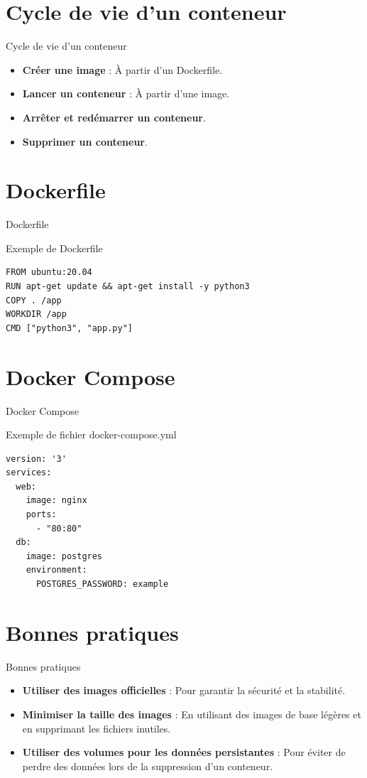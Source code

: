 \documentclass{clbeamer2024}
\begin{document}
\section{Cycle de vie d'un conteneur}
\begin{frame}{Cycle de vie d'un conteneur}
	\begin{itemize}
		\item \textbf{Créer une image} : À partir d'un Dockerfile.
		\item \textbf{Lancer un conteneur} : À partir d'une image.
		\item \textbf{Arrêter et redémarrer un conteneur}.
		\item \textbf{Supprimer un conteneur}.
	\end{itemize}
\end{frame}

\section{Dockerfile}
\begin{frame}[fragile]{Dockerfile}
	\begin{exampleblock}{Exemple de Dockerfile}
		\begin{verbatim}
FROM ubuntu:20.04
RUN apt-get update && apt-get install -y python3
COPY . /app
WORKDIR /app
CMD ["python3", "app.py"]
		\end{verbatim}
	\end{exampleblock}
\end{frame}

\section{Docker Compose}
\begin{frame}[fragile]{Docker Compose}
	\begin{exampleblock}{Exemple de fichier docker-compose.yml}
		\begin{verbatim}
version: '3'
services:
  web:
    image: nginx
    ports:
      - "80:80"
  db:
    image: postgres
    environment:
      POSTGRES_PASSWORD: example
		\end{verbatim}
	\end{exampleblock}
\end{frame}

\section{Bonnes pratiques}
\begin{frame}{Bonnes pratiques}
	\begin{itemize}
		\item \textbf{Utiliser des images officielles} : Pour garantir la sécurité et la stabilité.
		\item \textbf{Minimiser la taille des images} : En utilisant des images de base légères et en supprimant les fichiers inutiles.
		\item \textbf{Utiliser des volumes pour les données persistantes} : Pour éviter de perdre des données lors de la suppression d'un conteneur.
	\end{itemize}
\end{frame}
\end{document}
